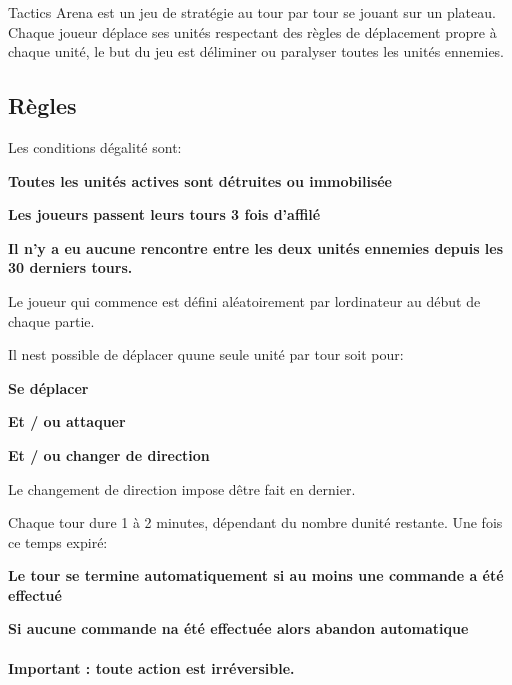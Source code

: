 Tactics Arena est un jeu de stratégie au tour par tour se jouant sur un plateau. Chaque joueur déplace ses unités respectant des règles de déplacement propre à chaque unité, le but du jeu est d\textquotesingle{}éliminer ou paralyser toutes les unités ennemies.

\subsection*{Règles}

Les conditions d\textquotesingle{}égalité sont\+:


\begin{DoxyItemize}
\item {\bfseries Toutes les unités actives sont détruites ou immobilisée}
\item {\bfseries Les joueurs passent leurs tours 3 fois d’affilé}
\item {\bfseries Il n’y a eu aucune rencontre entre les deux unités ennemies depuis les 30 derniers tours.}
\end{DoxyItemize}

Le joueur qui commence est défini aléatoirement par l\textquotesingle{}ordinateur au début de chaque partie.

Il n\textquotesingle{}est possible de déplacer qu\textquotesingle{}une seule unité par tour soit pour\+:


\begin{DoxyEnumerate}
\item {\bfseries Se déplacer}
\item {\bfseries Et / ou attaquer}
\item {\bfseries Et / ou changer de direction}
\end{DoxyEnumerate}

Le changement de direction impose d\textquotesingle{}être fait en dernier.

Chaque tour dure 1 à 2 minutes, dépendant du nombre d\textquotesingle{}unité restante. Une fois ce temps expiré\+:


\begin{DoxyItemize}
\item {\bfseries Le tour se termine automatiquement si au moins une commande a été effectué}
\item {\bfseries Si aucune commande n\textquotesingle{}a été effectuée alors abandon automatique}
\end{DoxyItemize}

\paragraph*{Important \+: toute action est irréversible.}

